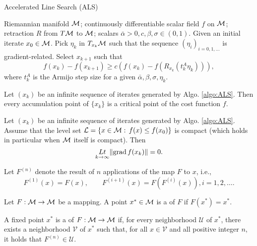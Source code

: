 \documentclass[11pt,a4paper]{article}
\begin{document}
\begin{algorithm}
    \centering
    \caption{Accelerated Line Search (ALS)}\label{algo:ALS}
    \begin{algorithmic}[1]
        \Require Riemannian manifold $\mathcal{M}$; continuously differentiable scalar field $f$ on $\mathcal{M}$; retraction $R$ from $T\mathcal{M}$ to $\mathcal{M}$; scalars $\bar{\alpha}>0,c,\beta,\sigma\in(0,1)$.
        \State Given an initial iterate $x_0\in\mathcal{M}$.
        \State Pick $\eta_k$ in $T_{x_k}\mathcal{M}$ such that the sequence $(\eta_i)_{i=0,1,\ldots}$ is gradient-related.
        \State Select $x_{k+1}$ such that 
        \begin{equation}
            f(x_k) - f(x_{k+1}) \ge c(f(x_k) - f(R_{x_k}(t^A_k\eta_k))),
        \end{equation}
        where $t^A_k$ is the Armijo step size for a given $\bar{\alpha},\beta,\sigma,\eta_k$.
        \EndFor
    \end{algorithmic}
\end{algorithm}

\begin{proposition}
Let $(x_k)$ be an infinite sequence of iterates generated by Algo. \ref{algo:ALS}. Then every accumulation point of $\{x_k\}$ is a critical point of the cost function $f$.
\end{proposition}

\begin{corollary}
Let $(x_k)$ be an infinite sequence of iterates generated by Algo. \ref{algo:ALS}. Assume that the level set $\mathcal{L} = \{x\in\mathcal{M}:\,f(x)\le f(x_0)\}$ is compact (which holds in particular when $\mathcal{M}$ itself is compact). Then 
\begin{equation*}
\underset{k\rightarrow\infty}{Lt} \|\text{grad}\, f(x_k)\| = 0.
\end{equation*}
\end{corollary}

Let $F^{(n)}$ denote the result of $n$ applications of the map $F$ to $x$, i.e., 
\begin{equation*}
    F^{(1)}(x) = F(x),\qquad F^{(i+1)}(x) = F(F^{(i)}(x)), i = 1,2,\ldots.
\end{equation*}

\begin{definition}
Let $F:\mathcal{M}\rightarrow \mathcal{M}$ be a mapping. A point $x^*\in\mathcal{M}$ is a  of $F$ if $F(x^*) = x^*$.
\end{definition}

\begin{definition}
A fixed point $x^*$ is a  of $F:\mathcal{M}\rightarrow \mathcal{M}$ if, for every neighborhood $\mathcal{U}$ of $x^*$, there exists a neighborhood $\mathcal{V}$ of $x^*$ such that, for all $x\in\mathcal{V}$ and all positive integer $n$, it holds that $F^{(n)}\in \mathcal{U}$. 
\end{definition}
\end{document}
